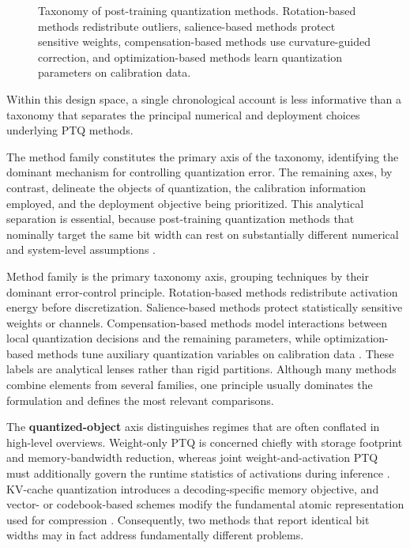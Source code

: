 \begin{figure}[H]
  \centering
  \makebox[\textwidth][c]{%
  }
  \caption[Taxonomy of post-training quantization methods]{Taxonomy of post-training quantization methods. Rotation-based methods redistribute outliers, salience-based methods protect sensitive weights, compensation-based methods use curvature-guided correction, and optimization-based methods learn quantization parameters on calibration data.}
  \label{fig:type_of_ptq}
\end{figure}

Within this design space, a single chronological account is less informative than a taxonomy that separates the principal numerical and deployment choices underlying PTQ methods.

The method family constitutes the primary axis of the taxonomy, identifying the dominant mechanism for controlling quantization error. The remaining axes, by contrast, delineate the objects of quantization, the calibration information employed, and the deployment objective being prioritized. This analytical separation is essential, because post-training quantization methods that nominally target the same bit width can rest on substantially different numerical and system-level assumptions \cite{frantar2022gptq,lin2024awq,shao2023omniquant}.

Method family is the primary taxonomy axis, grouping techniques by their dominant error-control principle. Rotation-based methods redistribute activation energy before discretization. Salience-based methods protect statistically sensitive weights or channels. Compensation-based methods model interactions between local quantization decisions and the remaining parameters, while optimization-based methods tune auxiliary quantization variables on calibration data \cite{ashkboos2024quarot,lin2024awq,frantar2022gptq,shao2023omniquant}. These labels are analytical lenses rather than rigid partitions. Although many methods combine elements from several families, one principle usually dominates the formulation and defines the most relevant comparisons.

The \textbf{quantized-object} axis distinguishes regimes that are often conflated in high-level overviews. Weight-only PTQ is concerned chiefly with storage footprint and memory-bandwidth reduction, whereas joint weight-and-activation PTQ must additionally govern the runtime statistics of activations during inference \cite{lin2024awq,xiao2023smoothquant}. KV-cache quantization introduces a decoding-specific memory objective, and vector- or codebook-based schemes modify the fundamental atomic representation used for compression \cite{ashkboos2024quarot,liu2024vptq}. Consequently, two methods that report identical bit widths may in fact address fundamentally different problems.

